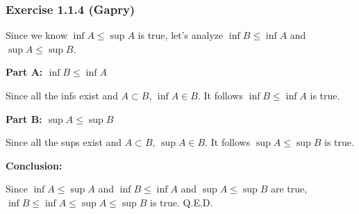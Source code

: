 \subsubsection*{Exercise 1.1.4 (Gapry)}

\begin{flushleft}
Since we know $\inf A \le \sup A$ is true, let's analyze $\inf B \le \inf A$ and $\sup A \le \sup B$.

\textbf{Part A: $\inf B \le \inf A$}

Since all the infs exist and $A \subset B$, $\inf A \in B$. It follows $\inf B \le \inf A$ is true.

\textbf{Part B: $\sup A \le \sup B$}

Since all the sups exist and $A \subset B$, $\sup A \in B$. It follows $\sup A \le \sup B$ is true.

\textbf{Conclusion:}

Since $\inf A \le \sup A$ and $\inf B \le \inf A$ and $\sup A \le \sup B$ are true, 
$\inf B \le \inf A \le \sup A \le \sup B$ is true. Q.E.D.

\end{flushleft}
